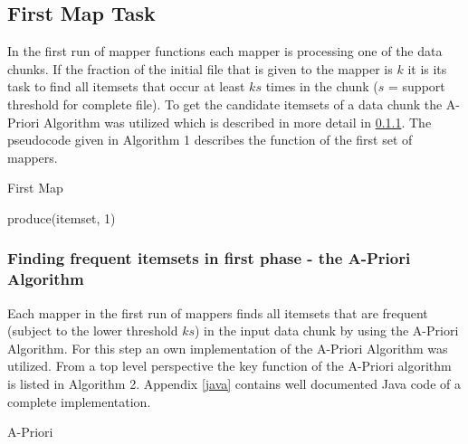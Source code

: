 \subsection{First Map Task}\label{first map task}
In the first run of mapper functions each mapper is processing one of the data chunks. If the fraction of the initial file that is given to the mapper is $k$ it is its task to find all itemsets that occur at least $ks$ times in the chunk ($s$ = support threshold for complete file). To get the candidate itemsets of a data chunk the A-Priori Algorithm was utilized which is described in more detail in \ref{A-Priori}.
The pseudocode given in Algorithm 1 describes the function of the first set of mappers.
\begin{algorithm}
  \caption{First Map}\label{First Map}
  \begin{algorithmic}[1]
     
            \State produce(itemset, 1)
       \EndFor

    \EndFunction
\end{algorithmic}
\end{algorithm}
\subsubsection{Finding frequent itemsets in first phase - the A-Priori Algorithm}\label{A-Priori}
Each mapper in the first run of mappers finds all itemsets that are frequent (subject to the lower threshold $ks$) in the input data chunk by using the A-Priori Algorithm. For this step an own implementation of the A-Priori Algorithm was utilized. From a top level perspective the key function of the A-Priori algorithm is listed in Algorithm 2. Appendix \ref{java} contains well documented Java code of a complete implementation.
\begin{algorithm}
  \caption{A-Priori}\label{Apriori}
  \begin{algorithmic}[1]
      \EndIf
      \EndIf
      \EndWhile
      \State {}
    \EndFunction
\end{algorithmic}
\end{algorithm}
